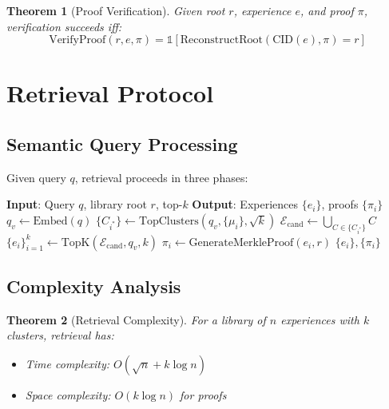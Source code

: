 \documentclass[11pt,letterpaper]{article}
\newtheorem{theorem}{Theorem}[section]
\begin{document}
\begin{theorem}[Proof Verification]
Given root $r$, experience $e$, and proof $\pi$, verification succeeds iff:
\begin{equation}
\text{VerifyProof}(r, e, \pi) = \mathbb{1}[\text{ReconstructRoot}(\text{CID}(e), \pi) = r]
\end{equation}
\end{theorem}

\section{Retrieval Protocol}
\label{sec:retrieval}

\subsection{Semantic Query Processing}

Given query $q$, retrieval proceeds in three phases:

\begin{algorithm}[t]
\caption{Experience Retrieval with Proof}
\label{alg:retrieval}
\begin{algorithmic}[1]
\STATE \textbf{Input}: Query $q$, library root $r$, top-$k$
\STATE \textbf{Output}: Experiences $\{e_i\}$, proofs $\{\pi_i\}$
\STATE {}
\STATE $q_v \leftarrow \text{Embed}(q)$
\STATE $\{C_{i^*}\} \leftarrow \text{TopClusters}(q_v, \{\mu_i\}, \sqrt{k})$
\STATE {}
\STATE $\mathcal{E}_{\text{cand}} \leftarrow \bigcup_{C \in \{C_{i^*}\}} C$
\STATE $\{e_i\}_{i=1}^k \leftarrow \text{TopK}(\mathcal{E}_{\text{cand}}, q_v, k)$
\STATE {}
    \STATE $\pi_i \leftarrow \text{GenerateMerkleProof}(e_i, r)$
\ENDFOR
\RETURN $\{e_i\}, \{\pi_i\}$
\end{algorithmic}
\end{algorithm}

\subsection{Complexity Analysis}

\begin{theorem}[Retrieval Complexity]
For a library of $n$ experiences with $k$ clusters, retrieval has:
\begin{itemize}
    \item Time complexity: $O(\sqrt{n} + k \log n)$
    \item Space complexity: $O(k \log n)$ for proofs
\end{itemize}
\end{theorem}
\end{document}
